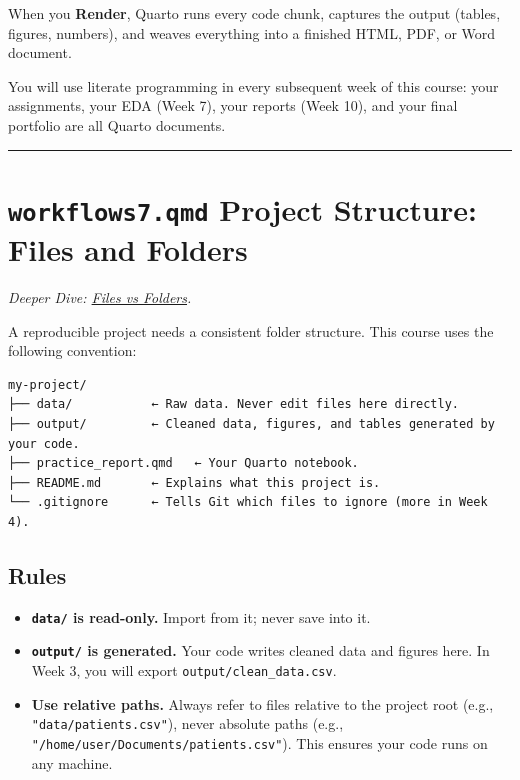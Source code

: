 \documentclass[
  letterpaper,
  DIV=11,
  numbers=noendperiod,
  oneside]{scrreprt}
\providecommand{\tightlist}{%
  \setlength{\itemsep}{0pt}\setlength{\parskip}{0pt}}
\begin{document}
When you \textbf{Render}, Quarto runs every code chunk, captures the
output (tables, figures, numbers), and weaves everything into a finished
HTML, PDF, or Word document.

You will use literate programming in every subsequent week of this
course: your assignments, your EDA (Week 7), your reports (Week 10), and
your final portfolio are all Quarto documents.

\begin{center}\rule{0.5\linewidth}{0.5pt}\end{center}

\section*{\texorpdfstring{\texttt{workflows7.qmd} Project Structure:
Files and
Folders}{workflows7.qmd Project Structure: Files and Folders}}\label{workflows7.qmd-project-structure-files-and-folders}


\emph{Deeper Dive: \href{workflows06-files-folders.qmd}{Files vs
Folders}.}

A reproducible project needs a consistent folder structure. This course
uses the following convention:

\begin{verbatim}
my-project/
├── data/           ← Raw data. Never edit files here directly.
├── output/         ← Cleaned data, figures, and tables generated by your code.
├── practice_report.qmd   ← Your Quarto notebook.
├── README.md       ← Explains what this project is.
└── .gitignore      ← Tells Git which files to ignore (more in Week 4).
\end{verbatim}

\subsection*{Rules}\label{rules}

\begin{itemize}
\tightlist
\item
  \textbf{\texttt{data/} is read-only.} Import from it; never save into
  it.
\item
  \textbf{\texttt{output/} is generated.} Your code writes cleaned data
  and figures here. In Week 3, you will export
  \texttt{output/clean\_data.csv}.
\item
  \textbf{Use relative paths.} Always refer to files relative to the
  project root (e.g., \texttt{"data/patients.csv"}), never absolute
  paths (e.g., \texttt{"/home/user/Documents/patients.csv"}). This
  ensures your code runs on any machine.
\end{itemize}
\end{document}
